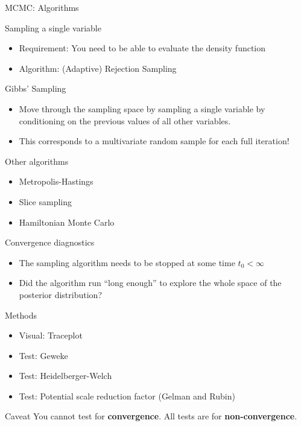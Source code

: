 \documentclass[10pt,handout]{beamer}
\begin{document}
\begin{frame}[t]{MCMC: Algorithms}

  \begin{block}{Sampling a single variable}
    \begin{itemize}
      \item Requirement: You need to be able to evaluate the density function
      \item Algorithm: (Adaptive) Rejection Sampling
    \end{itemize}
  \end{block}

  \begin{block}{Gibbs' Sampling}
     \begin{itemize}
       \item Move through the sampling space by sampling a single variable by conditioning on the previous values of all other variables.
       \item This corresponds to a multivariate random sample for each full iteration!
    \end{itemize}
  \end{block}

  \begin{block}{Other algorithms}
    \begin{itemize}
      \item Metropolis-Hastings
      \item Slice sampling
      \item Hamiltonian Monte Carlo
    \end{itemize}
    
  \end{block}

\end{frame}



\begin{frame}[t]{Convergence diagnostics}

  \begin{itemize}
    \item The sampling algorithm needs to be stopped at some time $t_0 < \infty$
    \item Did the algorithm run \enquote{long enough} to explore the whole space of the posterior distribution?
    \end{itemize}

      \begin{block}{Methods}
  \begin{itemize}
    \item Visual: Traceplot
      \item Test: Geweke
      \item Test: Heidelberger-Welch
      \item Test: Potential scale reduction factor (Gelman and Rubin)
    \end{itemize}
  \end{block}

  \begin{block}{Caveat}
      You cannot test for \textbf{convergence}. All tests are for \textbf{non-convergence}.
  \end{block}


\end{frame}
\end{document}
